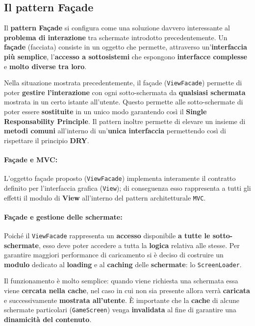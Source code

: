 \subsection{Il pattern Façade}
Il \textbf{pattern Façade} si configura come una soluzione davvero interessante al \textbf{problema di interazione} tra schermate introdotto precedentemente. Un \textbf{façade} (facciata) consiste in un oggetto che permette, attraverso un'\textbf{interfaccia più semplice}, l'\textbf{accesso a sottosistemi} che espongono \textbf{interfacce complesse} e \textbf{molto diverse tra loro}. 

Nella situazione mostrata precedentemente, il façade (\texttt{ViewFacade}) permette di poter \textbf{gestire l'interazione} con ogni sotto-schermata da \textbf{qualsiasi schermata} mostrata in un certo istante all'utente. Questo permette alle sotto-schermate di poter essere \textbf{sostituite} in un unico modo garantendo così il \textbf{Single Responsability Principle}. Il pattern inoltre permette di elevare un insieme di \textbf{metodi comuni} all'interno di un'\textbf{unica interfaccia} permettendo così di rispettare il principio \textbf{DRY}.

\paragraph{Façade e MVC:}
L'oggetto façade proposto (\texttt{ViewFacade}) implementa interamente il contratto definito per l'interfaccia grafica (\texttt{View}); di conseguenza esso rappresenta a tutti gli effetti il modulo di \textbf{View} all'interno del pattern architetturale \texttt{MVC}.

\paragraph{Façade e gestione delle schermate:}
Poiché il \texttt{ViewFacade} rappresenta un \textbf{accesso} disponibile \textbf{a tutte le sotto-schermate}, esso deve poter accedere a tutta la \textbf{logica} relativa alle stesse. Per garantire maggiori performance di caricamento si è deciso di costruire un \textbf{modulo} dedicato al \textbf{loading} e al \textbf{caching} delle \textbf{schermate}: lo \texttt{ScreenLoader}. 

Il funzionamento è molto semplice: quando viene richiesta una schermata essa viene \textbf{cercata nella cache}, nel caso in cui non sia presente allora verrà \textbf{caricata} e successivamente \textbf{mostrata all'utente}. È importante che la \textbf{cache} di alcune schermate particolari (\texttt{GameScreen}) venga \textbf{invalidata} al fine di garantire una \textbf{dinamicità del contenuto}.


